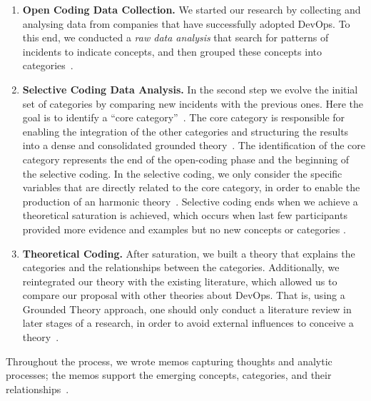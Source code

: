 \begin{enumerate}[label=(\Alph*)]
\item {\bf Open Coding Data Collection.} We started our research
  by collecting and analysing data from companies that have successfully adopted DevOps.
  To this end, we conducted a \emph{raw data analysis} that search for patterns of
  incidents to indicate concepts,  and then grouped these concepts into
  categories~\cite{stol2016grounded}.

\item {\bf Selective Coding Data Analysis.} In the second step we evolve
  the initial set of
  categories by comparing new incidents with the previous ones. Here the goal is
  to identify a ``core category''~\cite{stol2016grounded}.
  The core category is responsible for enabling the integration of the other
  categories and structuring the results into a dense and consolidated grounded
  theory~\cite{jantunen2014using}. The identification of the core category
  represents the end of the open-coding phase and the beginning of the selective coding.
  In the selective coding, we only consider the specific variables that are directly
  related to the core category, in order to enable the production of an harmonic
  theory~\cite{coleman2007using,hoda2011impact}. Selective coding ends when we
  achieve a theoretical saturation is achieved, which occurs when last few
  participants provided more evidence and examples but no new concepts or
  categories \cite{glase1967discovery}.

\item {\bf Theoretical Coding.} After saturation, we built a theory that
explains the categories and the relationships between the categories.
Additionally, we reintegrated our theory with the existing literature, {\color{red}which allowed us to compare our proposal
 with other theories about DevOps}. That is, using a Grounded Theory approach,
 one should only conduct a literature review in later stages of a research,
in order to avoid external influences to conceive a theory~\cite{adolph2012reconciling}.

\end{enumerate}

Throughout the process, we wrote memos capturing thoughts and analytic
processes; the memos support the emerging concepts, categories, and their
relationships~\cite{adolph2012reconciling}.


